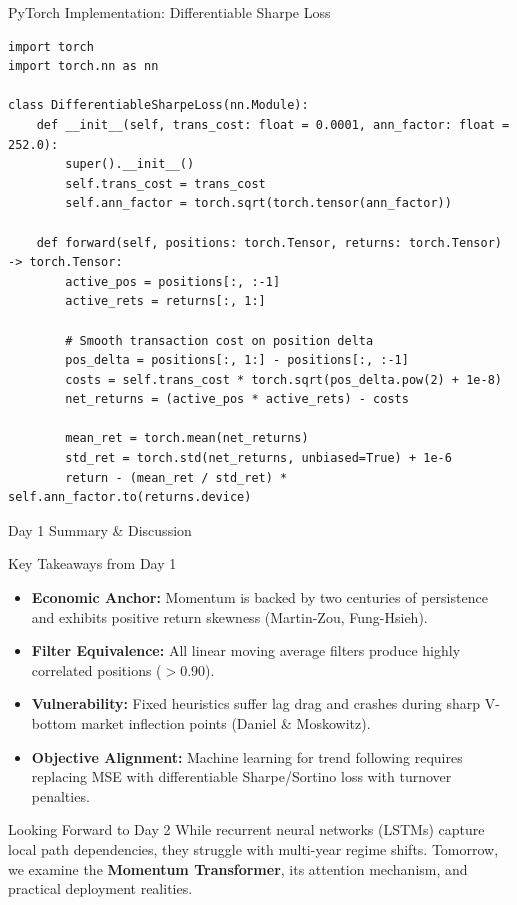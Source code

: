 \documentclass[10pt]{beamer}
\begin{document}
\begin{frame}[fragile]{PyTorch Implementation: Differentiable Sharpe Loss}
\begin{lstlisting}
import torch
import torch.nn as nn

class DifferentiableSharpeLoss(nn.Module):
    def __init__(self, trans_cost: float = 0.0001, ann_factor: float = 252.0):
        super().__init__()
        self.trans_cost = trans_cost
        self.ann_factor = torch.sqrt(torch.tensor(ann_factor))

    def forward(self, positions: torch.Tensor, returns: torch.Tensor) -> torch.Tensor:
        active_pos = positions[:, :-1]
        active_rets = returns[:, 1:]
        
        # Smooth transaction cost on position delta
        pos_delta = positions[:, 1:] - positions[:, :-1]
        costs = self.trans_cost * torch.sqrt(pos_delta.pow(2) + 1e-8)
        net_returns = (active_pos * active_rets) - costs
        
        mean_ret = torch.mean(net_returns)
        std_ret = torch.std(net_returns, unbiased=True) + 1e-6
        return - (mean_ret / std_ret) * self.ann_factor.to(returns.device)
\end{lstlisting}
\end{frame}

\begin{frame}{Day 1 Summary \& Discussion}
  \begin{block}{Key Takeaways from Day 1}
    \begin{itemize}\scriptsize
      \item \textbf{Economic Anchor:} Momentum is backed by two centuries of persistence and exhibits positive return skewness (Martin-Zou, Fung-Hsieh).
      \item \textbf{Filter Equivalence:} All linear moving average filters produce highly correlated positions ($>0.90$).
      \item \textbf{Vulnerability:} Fixed heuristics suffer lag drag and crashes during sharp V-bottom market inflection points (Daniel \& Moskowitz).
      \item \textbf{Objective Alignment:} Machine learning for trend following requires replacing MSE with differentiable Sharpe/Sortino loss with turnover penalties.
    \end{itemize}
  \end{block}
  \begin{alertblock}{Looking Forward to Day 2}
    While recurrent neural networks (LSTMs) capture local path dependencies, they struggle with multi-year regime shifts. Tomorrow, we examine the \textbf{Momentum Transformer}, its attention mechanism, and practical deployment realities.
  \end{alertblock}
\end{frame}
\end{document}
